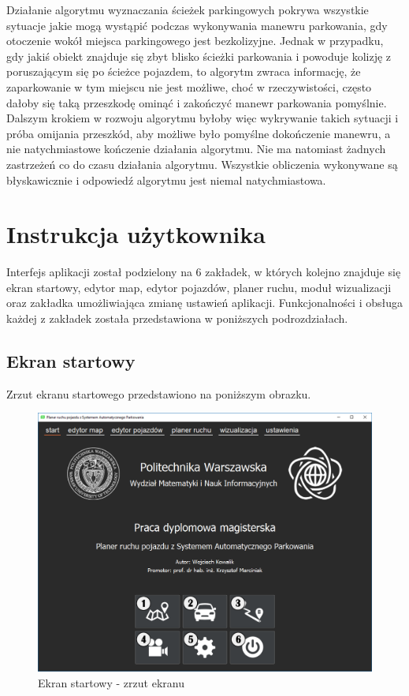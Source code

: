\documentclass[a4paper,11pt,twoside]{report}
\theoremstyle{definition}
\begin{document}
Działanie algorytmu wyznaczania ścieżek parkingowych pokrywa wszystkie sytuacje jakie mogą wystąpić podczas wykonywania manewru parkowania, gdy otoczenie wokół miejsca parkingowego jest bezkolizyjne. Jednak w przypadku, gdy jakiś obiekt znajduje się zbyt blisko ścieżki parkowania i powoduje kolizję z poruszającym się po ścieżce pojazdem, to algorytm zwraca informację, że zaparkowanie w tym miejscu nie jest możliwe, choć w rzeczywistości, często dałoby się taką przeszkodę ominąć i zakończyć manewr parkowania pomyślnie.  Dalszym krokiem w rozwoju algorytmu byłoby więc wykrywanie takich sytuacji i próba omijania przeszkód, aby możliwe było pomyślne dokończenie manewru, a nie natychmiastowe kończenie działania algorytmu. Nie ma natomiast żadnych zastrzeżeń co do czasu działania algorytmu. Wszystkie obliczenia wykonywane są błyskawicznie i odpowiedź algorytmu jest niemal natychmiastowa.

\chapter{Instrukcja użytkownika}

Interfejs aplikacji został podzielony na 6 zakładek, w których kolejno znajduje się ekran startowy, edytor map, edytor pojazdów, planer ruchu, moduł wizualizacji oraz zakładka umożliwiająca zmianę ustawień aplikacji. Funkcjonalności i obsługa każdej z zakładek została przedstawiona w poniższych podrozdziałach.

\section{Ekran startowy}

Zrzut ekranu startowego przedstawiono na poniższym obrazku.

\begin{figure}[h!]
\centering
\includegraphics[scale=0.5]{instructionStart}
\caption[Ekran startowy - zrzut ekranu]{Ekran startowy - zrzut ekranu}
\end{figure}
\end{document}
